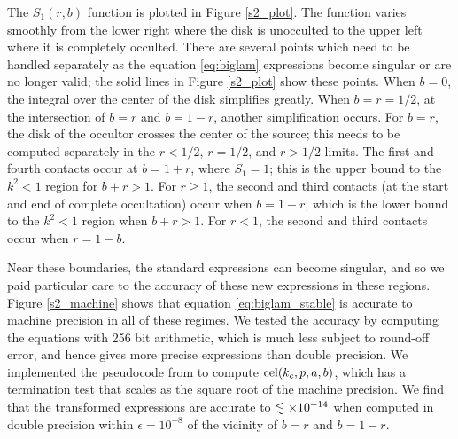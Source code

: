 \documentclass[modern]{aastex61}
\begin{document}
The $S_1(r,b)$ function is plotted in Figure \ref{s2_plot}.  The
function varies smoothly from the lower right where the disk is
unocculted to the upper left where it is completely occulted.
There are several points which need to be handled separately as
the equation \ref{eq:biglam} expressions become singular or are
no longer valid;  the solid lines in Figure \ref{s2_plot} show
these points.  When $b=0$, the integral over the center of the
disk simplifies greatly.  When $b=r=1/2$, at the intersection of
$b=r$ and $b=1-r$, another simplification occurs.  For $b=r$,
the disk of the occultor crosses the center of the source;
this needs to be computed separately in the $r<1/2$, $r=1/2$,
and $r>1/2$ limits.  The first and fourth contacts occur at
$b=1+r$, where $S_1=1$;  this is the upper bound to the $k^2 < 1$
region for $b+r >1$.
For $r \ge 1$, the second and third contacts (at the start and
end of complete occultation) occur when $b=1-r$, which is the
lower  bound to the $k^2<1$ region when $b+r >1$.
For $r < 1$, the second and third contacts occur when $r=1-b$.

Near these boundaries, the standard \citet{MandelAgol2002} expressions
can become singular, and so we paid particular care to the accuracy of these
new expressions in these regions.  Figure \ref{s2_machine} shows
that equation \ref{eq:biglam_stable} is accurate to machine
precision in all of these regimes.
We tested the accuracy by computing the equations with 256 bit
arithmetic, which is much less subject to round-off error, and
hence gives more precise expressions than double precision.  We implemented the
pseudocode from \citet{Bulirsch1969} to compute ${\rm cel}(k_c,p,a,b)$,
which has a termination test that scales as the square root of
the machine precision.  We find that the transformed expressions
are accurate to $\lesssim \times 10^{-14}$ when computed in double precision
within $\epsilon = 10^{-8}$ of the vicinity of $b=r$ and $b=1-r$.
\end{document}
